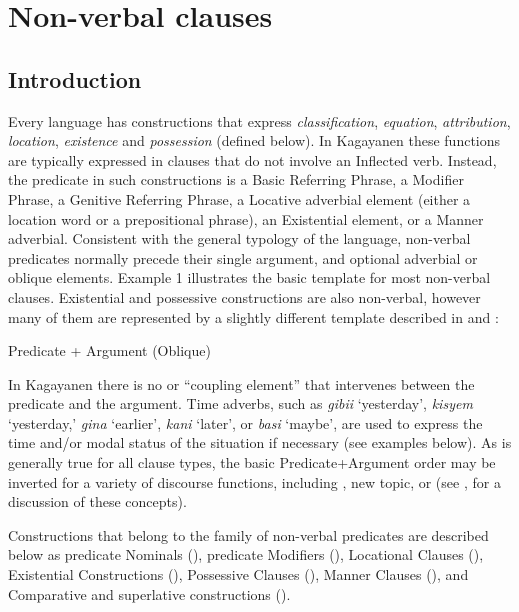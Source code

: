 \chapter{Non-verbal clauses}
\label{chap:non-verbalclauses}
\section{Introduction}
\label{sec:introduction-5}

Every language has constructions that express \textit{classification}, \textit{equation}, \textit{attribution}, \textit{location}, \textit{existence} and \textit{possession} (defined below).  In Kagayanen these functions are typically expressed in clauses that do not involve an Inflected verb. Instead, the predicate in such constructions is a Basic Referring Phrase, a Modifier Phrase, a Genitive Referring Phrase, a Locative adverbial element (either a location word or a prepositional phrase), an Existential element, or a Manner adverbial. Consistent with the general typology of the language, non-verbal predicates normally precede their single argument, and optional adverbial or oblique elements. Example 1 illustrates the basic template for most non-verbal clauses. Existential and possessive constructions are also non-verbal, however many of them are represented by a slightly different template described in  and :

\ea
\label{bkm:Ref118885283}Predicate + Argument (Oblique)
\z

In Kagayanen there is no  or “coupling element” that intervenes between the predicate and the argument. Time adverbs, such as \textit{gibii} ‘yesterday’, \textit{kisyem} ‘yesterday,’ \textit{gina} ‘earlier’, \textit{kani} ‘later’, or \textit{basi} ‘maybe’,  are used to express the time and/or modal status of the situation if necessary (see examples below). As is generally true for all clause types, the basic Predicate+Argument order may be inverted for a variety of discourse functions, including , new topic, or  (see ,  for a discussion of these concepts). 

Constructions that belong to the family of non-verbal predicates are described below as predicate Nominals (), predicate Modifiers (), Locational Clauses (), Existential Constructions (), Possessive Clauses (), Manner Clauses (), and Comparative and superlative constructions ().

